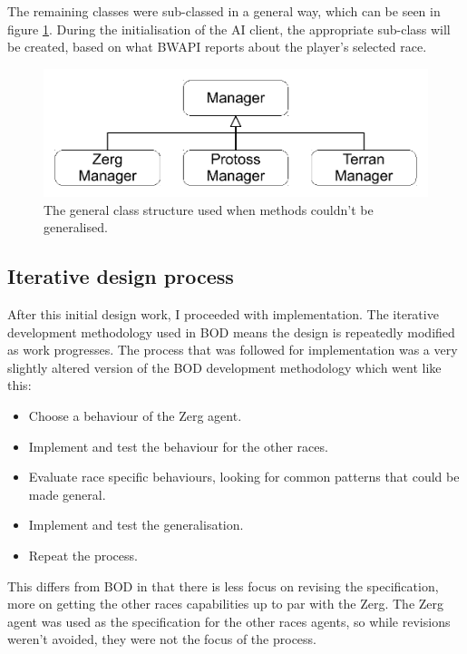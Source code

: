 \documentclass[11pt,openright,a4paper]{report}
\begin{document}
The remaining classes were sub-classed in a general way, which can be seen in figure \ref{fig:GeneralStructure}. During the initialisation of the AI client, the appropriate sub-class will be created, based on what BWAPI reports about the player's selected race.

\begin{figure}[h]
    \centering
    \includegraphics[scale=0.5]{GeneralStructure}
    \caption{The general class structure used when methods couldn't be generalised.}
    \label{fig:GeneralStructure}
\end{figure}

\subsection{Iterative design process}
After this initial design work, I proceeded with implementation. The iterative development methodology used in BOD means the design is repeatedly modified as work progresses. The process that was followed for implementation was a very slightly altered version of the BOD development methodology which went like this:
\begin{itemize}
\item{Choose a behaviour of the Zerg agent.}
\item{Implement and test the behaviour for the other races.}
\item{Evaluate race specific behaviours, looking for common patterns that could be made general.}
\item{Implement and test the generalisation.}
\item{Repeat the process.}
\end{itemize}

 This differs from BOD in that there is less focus on revising the specification, more on getting the other races capabilities up to par with the Zerg. The Zerg agent was used as the specification for the other races agents, so while revisions weren't avoided, they were not the focus of the process. 
\end{document}
